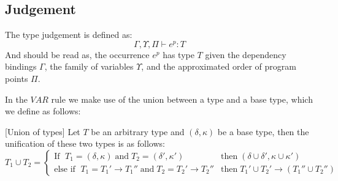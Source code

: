 \documentclass[../../master.tex]{subfiles}
\begin{document}
\subsection{Judgement}
The type judgement is defined as:
$$\Gamma,\Upsilon,\Pi\vdash e^p: T$$
And should be read as, the occurrence $e^p$ has type $T$ given the dependency bindings $\Gamma$, the family of variables $\Upsilon$, and the approximated order of program points $\Pi$.

In the $VAR$ rule we make use of the union between a type and a base type, which we define as follows:

\begin{definition}{[Union of types]}
	Let $T$ be an arbitrary type and $(\delta,\kappa)$ be a base type, then the unification of these two types is as follows:
	\begin{equation*}
		T_1\cup T_2=
		\left\{\begin{matrix}
			\mbox{If } \; T_1=(\delta,\kappa) \;\mbox{and}\; T_2=(\delta',\kappa')  & \mbox{then} \; (\delta\cup\delta',\kappa\cup\kappa')\\
			\mbox{else if } \; T_1=T_1'\rightarrow T_1''\;\mbox{and}\;T_2=T_2'\rightarrow T_2'' & \mbox{then} \; T_1'\cup T_2'\rightarrow (T_1''\cup T_2'')
		\end{matrix}\right.
	\end{equation*}
\end{definition}
\end{document}
